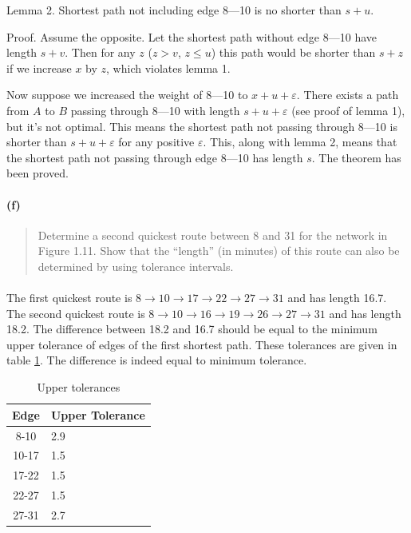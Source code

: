 Lemma 2. Shortest path not including edge 8---10 is no shorter than $s+u$.

Proof. Assume the opposite. Let the shortest path without edge 8---10 have length $s+v$. Then for any $z$ ($z>v$, $z \leq u$) this path would be shorter than $s+z$ if we increase $x$ by $z$, which violates lemma 1.

Now suppose we increased the weight of 8---10 to $x+u+\varepsilon$. There exists a path from $A$ to $B$ passing through 8---10 with length $s+u+\varepsilon$ (see proof of lemma 1), but it's not optimal. This means the shortest path not passing through 8---10 is shorter than $s+u+\varepsilon$ for any positive $\varepsilon$. This, along with lemma 2, means that the shortest path not passing through edge 8---10 has length $s$. The theorem has been proved.

\paragraph{(f)}

\begin{quote}
Determine a second quickest route between 8 and 31 for the network in Figure 1.11. Show that the “length” (in minutes) of this route can also be determined by using tolerance intervals.
\end{quote}

\paragraph{}
The first quickest route is $ 8 \rightarrow 10 \rightarrow 17 \rightarrow 22 \rightarrow 27 \rightarrow 31 $ and has length 16.7. The second quickest route is $ 8 \rightarrow 10 \rightarrow 16 \rightarrow 19 \rightarrow 26 \rightarrow 27 \rightarrow 31 $ and has length 18.2. The difference between 18.2 and 16.7 should be equal to the minimum upper tolerance of edges of the first shortest path. These tolerances are given in table \ref{tolerances-1-2f}. The difference is indeed equal to minimum tolerance.

\begin{table}[H]
\centering
\begin{tabular}{|c|l|}
\hline
Edge & Upper Tolerance \\ \hline
8-10 & 2.9 \\ \hline
10-17 & 1.5 \\ \hline
17-22 & 1.5 \\ \hline
22-27 & 1.5 \\ \hline
27-31 & 2.7 \\ \hline
\end{tabular}
\caption{Upper tolerances}
\label{tolerances-1-2f}
\end{table}

